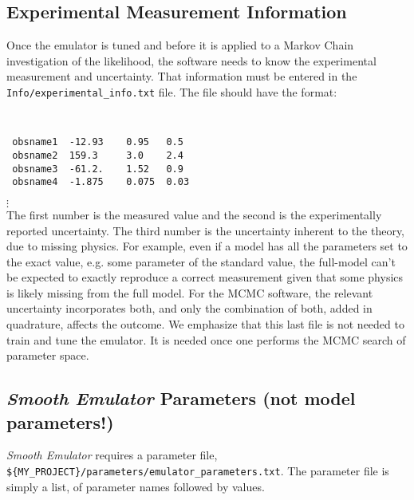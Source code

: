 \documentclass[UserManual.tex]{subfiles}
\begin{document}
\begin{enumerate}
\subsection{Experimental Measurement Information}
Once the emulator is tuned and before it is applied to a Markov Chain investigation of the likelihood, the software needs to know the experimental measurement and uncertainty. That information must be entered in the {\tt Info/experimental\_info.txt} file. The file should have the format:
{\tt
\begin{verbatim}
 obsname1  -12.93    0.95   0.5
 obsname2  159.3     3.0    2.4
 obsname3  -61.2.    1.52   0.9
 obsname4  -1.875    0.075  0.03
\end{verbatim}}
\vspace*{-16pt}
 \hspace*{28pt}$\vdots$\\
The first number is the measured value and the second is the experimentally reported uncertainty. The third number is the uncertainty inherent to the theory, due to missing physics. For example, even if a model has all the parameters set to the exact value, e.g. some parameter of the standard value, the full-model can't be expected to exactly reproduce a correct measurement given that some physics is likely missing from the full model. For the MCMC software, the relevant uncertainty incorporates both, and only the combination of both, added in quadrature, affects the outcome. We emphasize that this last file is not needed to train and tune the emulator. It is needed once one performs the MCMC search of parameter space. 


\end{enumerate}

\subsection{{\it Smooth Emulator} Parameters (not model parameters!)}

{\it Smooth Emulator} requires a parameter file, {\tt \$\{MY\_PROJECT\}/parameters/emulator\_parameters.txt}. The parameter file is simply a list, of parameter names followed by values. 
\end{document}
